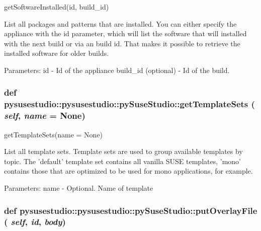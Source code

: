 \label{classpysusestudio_1_1pysusestudio_1_1py_suse_studio_a87cc59fb9ae5ca6a223b4650d88fac8f}
\begin{DoxyVerb}getSoftwareInstalled(id, build_id)

        List all packages and patterns that are installed. You can either specify the 
        appliance with the id parameter, which will list the software 
        that will installed with the next build or via an build id. That makes it possible 
        to retrieve the installed software for older builds.   
            
            Parameters:
id - Id of the appliance
build_id (optional) - Id of the build.

\end{DoxyVerb}
 \hypertarget{classpysusestudio_1_1pysusestudio_1_1py_suse_studio_af1df8da11a13134ea8db3424abf07007}{
\subsubsection[{getTemplateSets}]{\setlength{\rightskip}{0pt plus 5cm}def pysusestudio::pysusestudio::pySuseStudio::getTemplateSets ( {\em self}, \/   {\em name} = {\ttfamily None})}}
\label{classpysusestudio_1_1pysusestudio_1_1py_suse_studio_af1df8da11a13134ea8db3424abf07007}
\begin{DoxyVerb}getTemplateSets(name = None)

        List all template sets.
        Template sets are used to group available templates by topic. The 'default'
        template set contains all vanilla SUSE templates, 'mono' contains those that
        are optimized to be used for mono applications, for example. 
            
        Parameters:
            name - Optional. Name of template

\end{DoxyVerb}
 \hypertarget{classpysusestudio_1_1pysusestudio_1_1py_suse_studio_ae639fded13dd70025daea866e3b240bf}{
\subsubsection[{putOverlayFile}]{\setlength{\rightskip}{0pt plus 5cm}def pysusestudio::pysusestudio::pySuseStudio::putOverlayFile ( {\em self}, \/   {\em id}, \/   {\em body})}}
